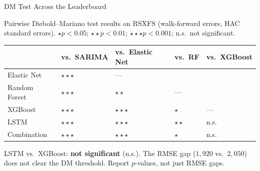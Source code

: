 \documentclass[aspectratio=169, 10pt]{beamer}
\begin{document}
\begin{frame}{DM Test Across the Leaderboard}
  \vspace{0.05cm}

  \vspace{0.05cm}

  {\small Pairwise Diebold--Mariano test results on RSXFS (walk-forward errors,
  HAC standard errors). $\star p < 0.05$;\; $\star\star p < 0.01$;\;
  $\star\star\star p < 0.001$;\; n.s.\ not significant.}
  \vspace{0.1cm}

  \begin{center}
  {\footnotesize
  \begin{tabular}{lp{1.7cm}p{1.7cm}p{1.7cm}p{1.7cm}}
    \toprule
    & \textbf{vs.\ SARIMA} & \textbf{vs.\ Elastic Net} & \textbf{vs.\ RF} & \textbf{vs.\ XGBoost} \\
    \midrule
    Elastic Net  & $\star\star\star$ & ---              &                   & \\
    Random Forest & $\star\star\star$ & $\star\star$     & ---               & \\
    XGBoost      & $\star\star\star$ & $\star\star\star$ & $\star$           & --- \\
    LSTM         & $\star\star\star$ & $\star\star\star$ & $\star\star$      & n.s. \\
    Combination  & $\star\star\star$ & $\star\star\star$ & $\star$           & n.s. \\
    \bottomrule
  \end{tabular}
  }
  \end{center}

  \vspace{0.1cm}
  \begin{keybox}
    {\small LSTM vs.\ XGBoost: \textbf{not significant} (n.s.).
    The RMSE gap ($1{,}920$ vs.\ $2{,}050$) does not clear the DM
    threshold. Report $p$-values, not just RMSE gaps.}
  \end{keybox}
\end{frame}

\end{document}
